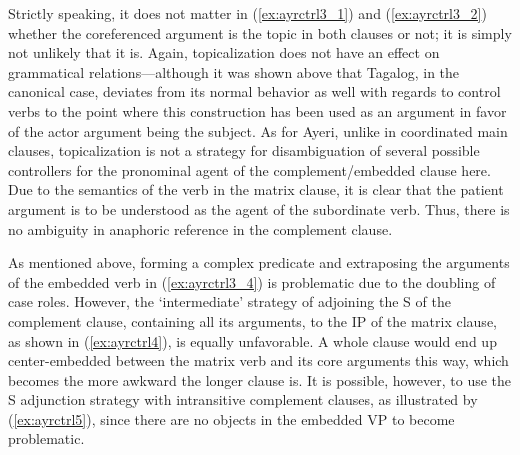 \begin{figure}

\xe%
\end{figure}

Strictly speaking, it does not matter in (\ref{ex:ayrctrl3_1}) and
(\ref{ex:ayrctrl3_2}) whether the coreferenced argument is the topic in both
clauses or not; it is simply not unlikely that it is. Again, topicalization
does not have an effect on grammatical relations---although it was shown above
that Tagalog, in the canonical case, deviates from its normal behavior as well
with regards to control verbs to the point where this construction has been
used as an argument in favor of the actor argument being the subject. As for
Ayeri, unlike in coordinated main clauses, topicalization is not a strategy for
disambiguation of several possible controllers for the pronominal agent of the
complement/embedded clause here. Due to the semantics of the verb in the matrix
clause, it is clear that the patient argument is to be understood as the agent
of the subordinate verb. Thus, there is no ambiguity in anaphoric reference in
the complement clause.

As mentioned above, forming a complex predicate and extraposing the arguments
of the embedded verb in (\ref{ex:ayrctrl3_4}) is problematic due to the
doubling of case roles. However, the `intermediate' strategy of adjoining the
S of the complement clause, containing all its arguments, to the IP of the
matrix clause, as shown in (\ref{ex:ayrctrl4}), is equally unfavorable. A whole
clause would end up center-embedded between the matrix verb and its core
arguments this way, which becomes the more awkward the longer clause is. It is
possible, however, to use the S adjunction strategy with intransitive
complement clauses, as illustrated by (\ref{ex:ayrctrl5}), since there are no
objects in the embedded VP to become problematic.

